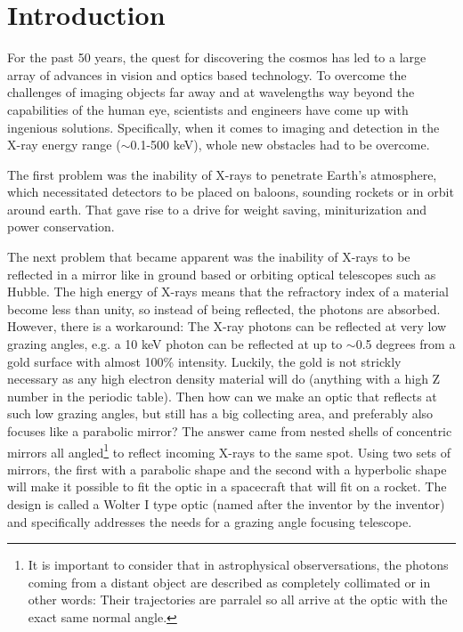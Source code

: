 \chapter{Introduction}
For the past 50 years, the quest for discovering the cosmos has led to a large array of advances in vision and optics based technology. To overcome the challenges of imaging objects far away and at wavelengths way beyond the capabilities of the human eye, scientists and engineers have come up with ingenious solutions. Specifically, when it comes to imaging and detection in the X-ray energy range ($\sim$0.1-500 keV), whole new obstacles had to be overcome.

The first problem was the inability of X-rays to penetrate Earth's atmosphere, which necessitated detectors to be placed on baloons, sounding rockets or in orbit around earth. That gave rise to a drive for weight saving, miniturization and power conservation.

The next problem that became apparent was the inability of X-rays to be reflected in a mirror like in ground based or orbiting optical telescopes such as Hubble. The high energy of X-rays means that the refractory index of a material become less than unity, so instead of being reflected, the photons are absorbed. However, there is a workaround: The X-ray photons can be reflected at very low grazing angles, e.g. a 10 keV photon can be reflected at up to $\sim$0.5 degrees from a gold surface with almost 100\% intensity. Luckily, the gold is not strickly necessary as any high electron density material will do (anything with a high Z number in the periodic table). Then how can we make an optic that reflects at such low grazing angles, but still has a big collecting area, and preferably also focuses like a parabolic mirror? The answer came from nested shells of concentric mirrors all angled\footnote{It is important to consider that in astrophysical observersations, the photons coming from a distant object are described as completely collimated or in other words: Their trajectories are parralel so all arrive at the optic with the exact same normal angle.} to reflect incoming X-rays to the same spot. Using two sets of mirrors, the first with a parabolic shape and the second with a hyperbolic shape will make it possible to fit the optic in a spacecraft that will fit on a rocket. The design is called a Wolter I type optic (named after the inventor by the inventor) and specifically addresses the needs for a grazing angle focusing telescope.


